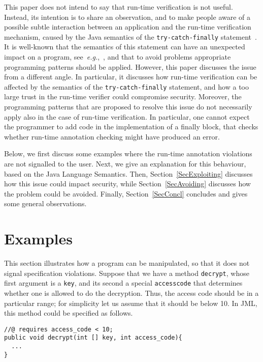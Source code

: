 \documentclass[]{llncs}
\def \unsc      {\symbol{95}}
\begin{document}
This paper does not intend to say that run-time verification is not
useful. Instead, its intention is to share an observation, and to make
people aware of a possible subtle interaction between an application
and the run-time verification mechanism, caused by the Java semantics
of the \texttt{try-catch-finally} statement~\cite{GoslingJSB05}. It is
well-known that the semantics of this statement can have an unexpected
impact on a program, see~\emph{e.g.},~\cite{Eckel02,Jenkov-online},
and that to avoid problems appropriate programming patterns should be
applied. However, this paper discusses the issue from a different
angle. In particular, it discusses how run-time verification can be
affected by the semantics of the \texttt{try-catch-finally} statement,
and how a too large trust in the run-time verifier could compromise
security. Moreover, the programming patterns that are proposed to
resolve this issue do not necessarily apply also in the case of
run-time verification. In particular, one cannot expect the programmer
to add code in the implementation of a finally block, that checks
whether run-time annotation checking might have produced an error.

Below, we first discuss some examples where the run-time annotation
violations are not signalled to the user. Next, we give an explanation
for this behaviour, based on the Java Language Semantics. Then,
Section~\ref{SecExploiting} discusses how this issue could impact
security, while Section~\ref{SecAvoiding} discusses how the problem
could be avoided. Finally, Section~\ref{SecConcl} concludes and gives
some general observations.

\section{Examples}\label{SecExample}

This section illustrates how a program can be manipulated, so that it
does not signal specification violations. Suppose that we have a
method \texttt{decrypt}, whose first argument is a \texttt{key}, and
its second a special \texttt{access\unsc code} that determines
whether one is allowed to do the decryption. Thus, the access code
should be in a particular range; for simplicity let us assume that it
should be below 10. In JML, this method could be specified as follows.

\begin{verbatim}
//@ requires access_code < 10;
public void decrypt(int [] key, int access_code){
  ...
}
\end{verbatim}
\end{document}
